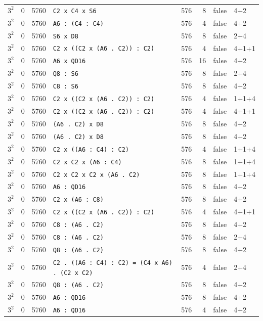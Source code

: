 \begin{longtable}{llrlrrll}
$3^2$ & 0 & 5760 & \texttt{C2 x C4 x S6} & 576 & 8 & false & 4+2\\
$3^2$ & 0 & 5760 & \texttt{A6 : (C4 : C4)} & 576 & 4 & false & 4+2\\
$3^2$ & 0 & 5760 & \texttt{S6 x D8} & 576 & 8 & false & 2+4\\
$3^2$ & 0 & 5760 & \texttt{C2 x ((C2 x (A6 . C2)) : C2)} & 576 & 4 & false & 4+1+1\\
$3^2$ & 0 & 5760 & \texttt{A6 x QD16} & 576 & 16 & false & 4+2\\
$3^2$ & 0 & 5760 & \texttt{Q8 : S6} & 576 & 8 & false & 2+4\\
$3^2$ & 0 & 5760 & \texttt{C8 : S6} & 576 & 8 & false & 4+2\\
$3^2$ & 0 & 5760 & \texttt{C2 x ((C2 x (A6 . C2)) : C2)} & 576 & 4 & false & 1+1+4\\
$3^2$ & 0 & 5760 & \texttt{C2 x ((C2 x (A6 . C2)) : C2)} & 576 & 4 & false & 4+1+1\\
$3^2$ & 0 & 5760 & \texttt{(A6 . C2) x D8} & 576 & 8 & false & 4+2\\
$3^2$ & 0 & 5760 & \texttt{(A6 . C2) x D8} & 576 & 8 & false & 4+2\\
$3^2$ & 0 & 5760 & \texttt{C2 x ((A6 : C4) : C2)} & 576 & 4 & false & 1+1+4\\
$3^2$ & 0 & 5760 & \texttt{C2 x C2 x (A6 : C4)} & 576 & 8 & false & 1+1+4\\
$3^2$ & 0 & 5760 & \texttt{C2 x C2 x C2 x (A6 . C2)} & 576 & 8 & false & 1+1+4\\
$3^2$ & 0 & 5760 & \texttt{A6 : QD16} & 576 & 8 & false & 4+2\\
$3^2$ & 0 & 5760 & \texttt{C2 x (A6 : C8)} & 576 & 8 & false & 4+2\\
$3^2$ & 0 & 5760 & \texttt{C2 x ((C2 x (A6 . C2)) : C2)} & 576 & 4 & false & 4+1+1\\
$3^2$ & 0 & 5760 & \texttt{C8 : (A6 . C2)} & 576 & 8 & false & 4+2\\
$3^2$ & 0 & 5760 & \texttt{C8 : (A6 . C2)} & 576 & 8 & false & 2+4\\
$3^2$ & 0 & 5760 & \texttt{Q8 : (A6 . C2)} & 576 & 8 & false & 4+2\\
$3^2$ & 0 & 5760 & \texttt{C2 . ((A6 : C4) : C2) = (C4 x A6) . (C2 x C2)} & 576 & 4 & false & 2+4\\
$3^2$ & 0 & 5760 & \texttt{Q8 : (A6 . C2)} & 576 & 8 & false & 4+2\\
$3^2$ & 0 & 5760 & \texttt{A6 : QD16} & 576 & 8 & false & 4+2\\
$3^2$ & 0 & 5760 & \texttt{A6 : QD16} & 576 & 4 & false & 4+2\\

\end{longtable}

